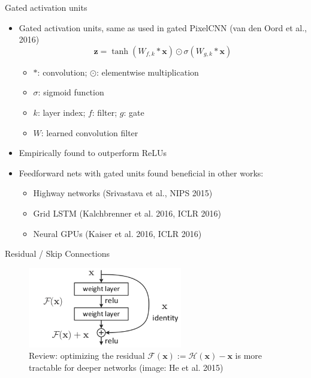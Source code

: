 \documentclass{beamer}
\begin{document}
  \begin{frame}{Gated activation units}
    \begin{itemize}
      \item Gated activation units, same as used in gated PixelCNN (van den Oord et al., 2016)
        \[
          \mathbf{z} = \tanh(W_{f, k} * \mathbf{x}) \odot \sigma(W_{g, k} * \mathbf{x})
        \]
        \begin{itemize}
          \item $*$: convolution; $\odot$: elementwise multiplication
          \item $\sigma$: sigmoid function
          \item $k$: layer index; $f$: filter; $g$: gate
          \item $W$: learned convolution filter
        \end{itemize}
      \item Empirically found to outperform ReLUs
      \item Feedforward nets with gated units found beneficial in other works:
        \begin{itemize}
          \item Highway networks (Srivastava et al., NIPS 2015)
          \item Grid LSTM (Kalchbrenner et al. 2016, ICLR 2016)
          \item Neural GPUs (Kaiser et al. 2016, ICLR 2016)
        \end{itemize}
    \end{itemize}
  \end{frame}

  \begin{frame}{Residual / Skip Connections}
    \begin{figure}
      \includegraphics[width=0.6\textwidth]{img/residual_layer_he.png}
      \caption{Review: optimizing the residual $\mathcal{F}(\mathbf{x}) := \mathcal{H}(\mathbf{x}) - \mathbf{x}$ is more tractable for deeper networks (image: He et al. 2015)}
    \end{figure}
  \end{frame}
\end{document}
